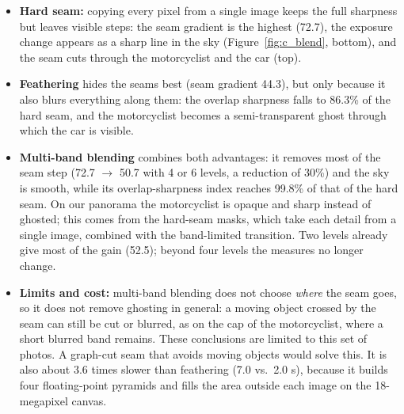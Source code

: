 \documentclass[a4paper,12pt]{article}
\begin{document}
\begin{itemize}
    \item \textbf{Hard seam:} copying every pixel from a single image keeps the full sharpness but leaves visible steps: the seam gradient is the highest (72.7), the exposure change appears as a sharp line in the sky (Figure~\ref{fig:c_blend}, bottom), and the seam cuts through the motorcyclist and the car (top).
    \item \textbf{Feathering} hides the seams best (seam gradient 44.3), but only because it also blurs everything along them: the overlap sharpness falls to 86.3\% of the hard seam, and the motorcyclist becomes a semi-transparent ghost through which the car is visible.
    \item \textbf{Multi-band blending} combines both advantages: it removes most of the seam step (72.7 $\to$ 50.7 with 4 or 6 levels, a reduction of 30\%) and the sky is smooth, while its overlap-sharpness index reaches 99.8\% of that of the hard seam. On our panorama the motorcyclist is opaque and sharp instead of ghosted; this comes from the hard-seam masks, which take each detail from a single image, combined with the band-limited transition. Two levels already give most of the gain (52.5); beyond four levels the measures no longer change.
    \item \textbf{Limits and cost:} multi-band blending does not choose \emph{where} the seam goes, so it does not remove ghosting in general: a moving object crossed by the seam can still be cut or blurred, as on the cap of the motorcyclist, where a short blurred band remains. These conclusions are limited to this set of photos. A graph-cut seam that avoids moving objects would solve this. It is also about 3.6 times slower than feathering (7.0 vs.\ 2.0 s), because it builds four floating-point pyramids and fills the area outside each image on the 18-megapixel canvas.
\end{itemize}

\end{document}
